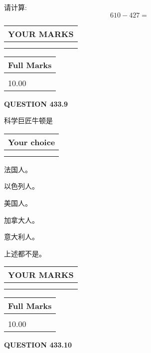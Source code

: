 \documentclass{ctexart}
\begin{document}
  
 
请计算:
\begin{equation}
610 -   %
427 = \nonumber
\end{equation}
 

 

 
  
\vspace{0.2in}
  
\noindent\begin{tabular}{|l|}
\hline
 YOUR MARKS  \\
\hline
 \\ 
 \\ 
\hline
\end{tabular}
\hspace{0.05in} \begin{tabular}{|l|}
\hline
 Full Marks  \\
\hline
 \\ 
10.00 \\
\hline
\end{tabular}
{\textbf{\Large{QUESTION
433.9 
}}}
  
  
科学巨匠牛顿是
  
  
\noindent\hspace{3.0in} \begin{tabular}{|l|}
\hline
Your choice \\
\hline
 \\ 
 \\ 
\hline
\end{tabular}
  
  
 
 
法国人。
 
 
以色列人。
 
 
美国人。
 
 
加拿大人。
 
 
意大利人。
 
 
 上述都不是。
 
 
  
\vspace{0.2in}
  
\noindent\begin{tabular}{|l|}
\hline
 YOUR MARKS  \\
\hline
 \\ 
 \\ 
\hline
\end{tabular}
\hspace{0.05in} \begin{tabular}{|l|}
\hline
 Full Marks  \\
\hline
 \\ 
10.00 \\
\hline
\end{tabular}
{\textbf{\Large{QUESTION
433.10 
}}}
  
\end{document}
